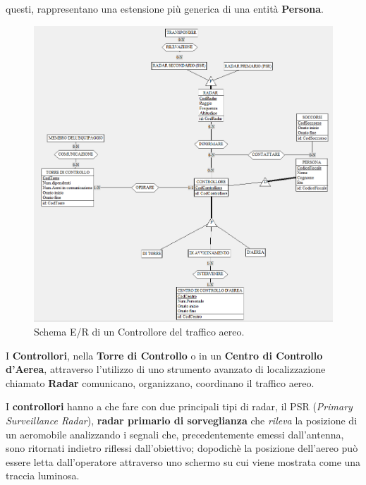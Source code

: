 \textsf{\small questi, rappresentano una estensione più generica di una entità \textbf{Persona}.}\\

\begin{figure}[H] %
	\centering
	\includegraphics[width=1.2\linewidth, height=1.2\textheight, keepaspectratio]{./img/Controllore.png}
	\caption{Schema E/R di un Controllore del traffico aereo.}
	\label{fig:schema_controllore}
\end{figure}

\textsf{\small I \textbf{Controllori}, nella \textbf{Torre di Controllo} o in un \textbf{Centro di Controllo d'Aerea}, attraverso l'utilizzo di uno strumento avanzato di localizzazione chiamato \textbf{Radar} comunicano, organizzano, coordinano il traffico aereo.}\break

\textsf{\small I \textbf{controllori} hanno a che fare con due principali tipi di radar, il PSR (\emph{Primary Surveillance Radar}), \textbf{radar primario di sorveglianza} che \emph{rileva} la posizione di un aeromobile analizzando i segnali che, precedentemente emessi dall'antenna, sono ritornati indietro riflessi dall'obiettivo; dopodichè la posizione dell'aereo può essere letta dall'operatore attraverso uno schermo su cui viene mostrata come una traccia luminosa.}\\

